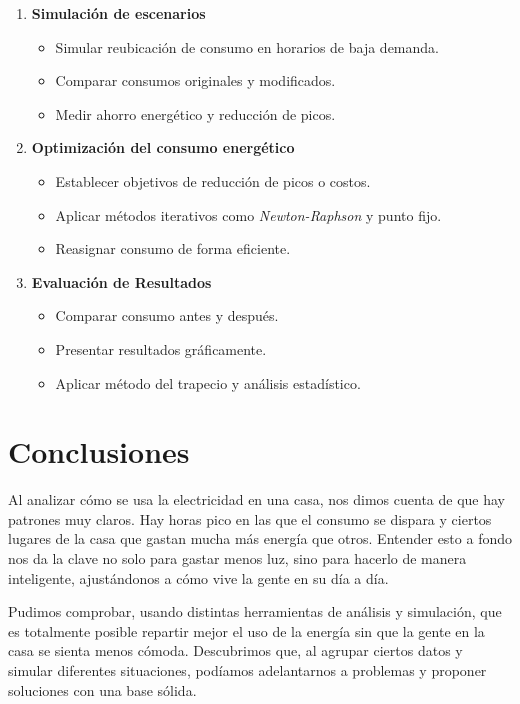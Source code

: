 \documentclass[12pt]{report}
\begin{document}
\begin{enumerate}
    \item \textbf{Simulación de escenarios}
    \begin{itemize}
        \item Simular reubicación de consumo en horarios de baja demanda.
        \item Comparar consumos originales y modificados.
        \item Medir ahorro energético y reducción de picos.
    \end{itemize}

    \item \textbf{Optimización del consumo energético}
    \begin{itemize}
        \item Establecer objetivos de reducción de picos o costos.
        \item Aplicar métodos iterativos como \textit{Newton-Raphson} y punto fijo.
        \item Reasignar consumo de forma eficiente.
    \end{itemize}

    \item \textbf{Evaluación de Resultados}
    \begin{itemize}
        \item Comparar consumo antes y después.
        \item Presentar resultados gráficamente.
        \item Aplicar método del trapecio y análisis estadístico.
    \end{itemize}
\end{enumerate}

\section*{Conclusiones} 
Al analizar cómo se usa la electricidad en una casa, nos dimos cuenta de que hay patrones muy claros. Hay horas pico en las que el consumo se dispara y ciertos lugares de la casa que gastan mucha más energía que otros. Entender esto a fondo nos da la clave no solo para gastar menos luz, sino para hacerlo de manera inteligente, ajustándonos a cómo vive la gente en su día a día.

Pudimos comprobar, usando distintas herramientas de análisis y simulación, que es totalmente posible repartir mejor el uso de la energía sin que la gente en la casa se sienta menos cómoda. Descubrimos que, al agrupar ciertos datos y simular diferentes situaciones, podíamos adelantarnos a problemas y proponer soluciones con una base sólida.
\end{document}
